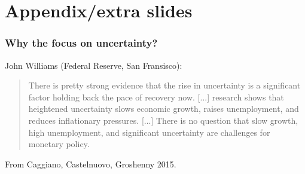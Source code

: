\documentclass[handout,english]{beamer}
\begin{document}
\section{Appendix/extra slides}
\begin{frame}
\frametitle{Why the focus on uncertainty?}
John Williams (Federal Reserve, San Fransisco):

\begin{quote}
There is pretty strong evidence that the rise in uncertainty is a significant factor holding back the pace of recovery now. [...] research shows that heightened uncertainty slows economic growth, raises unemployment, and reduces inflationary pressures. [...] There is no question that slow growth, high unemployment, and significant uncertainty are challenges for monetary policy.
\end{quote}
From Caggiano, Castelnuovo, Groshenny 2015.
\end{frame}
\end{document}
